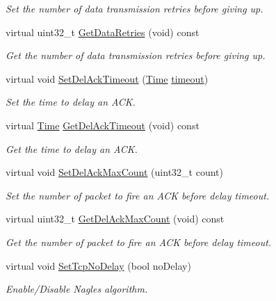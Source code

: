 \begin{DoxyCompactItemize}
\begin{DoxyCompactList}\small\item\em Set the number of data transmission retries before giving up. \end{DoxyCompactList}\item 
virtual uint32\+\_\+t \hyperlink{classns3_1_1NscTcpSocketImpl_a79be5a59abfa129472f9d64cab449ed4}{Get\+Data\+Retries} (void) const 
\begin{DoxyCompactList}\small\item\em Get the number of data transmission retries before giving up. \end{DoxyCompactList}\item 
virtual void \hyperlink{classns3_1_1NscTcpSocketImpl_a555fcebd11a1ee4c50c0da47b5fb5a07}{Set\+Del\+Ack\+Timeout} (\hyperlink{classns3_1_1Time}{Time} \hyperlink{openflow-switch_8cc_a386d174ae121d1cfa279074b7e209714}{timeout})
\begin{DoxyCompactList}\small\item\em Set the time to delay an A\+CK. \end{DoxyCompactList}\item 
virtual \hyperlink{classns3_1_1Time}{Time} \hyperlink{classns3_1_1NscTcpSocketImpl_afb8b8e7ab529e881d978d068c26543b8}{Get\+Del\+Ack\+Timeout} (void) const 
\begin{DoxyCompactList}\small\item\em Get the time to delay an A\+CK. \end{DoxyCompactList}\item 
virtual void \hyperlink{classns3_1_1NscTcpSocketImpl_a281ad3bf761f8557e8433451e7431d7f}{Set\+Del\+Ack\+Max\+Count} (uint32\+\_\+t count)
\begin{DoxyCompactList}\small\item\em Set the number of packet to fire an A\+CK before delay timeout. \end{DoxyCompactList}\item 
virtual uint32\+\_\+t \hyperlink{classns3_1_1NscTcpSocketImpl_a01eed1f2473336080603d819ee91de57}{Get\+Del\+Ack\+Max\+Count} (void) const 
\begin{DoxyCompactList}\small\item\em Get the number of packet to fire an A\+CK before delay timeout. \end{DoxyCompactList}\item 
virtual void \hyperlink{classns3_1_1NscTcpSocketImpl_a75669697337517798c5379f16924df21}{Set\+Tcp\+No\+Delay} (bool no\+Delay)
\begin{DoxyCompactList}\small\item\em Enable/\+Disable Nagle\textquotesingle{}s algorithm. \end{DoxyCompactList}\item 

\end{DoxyCompactItemize}
